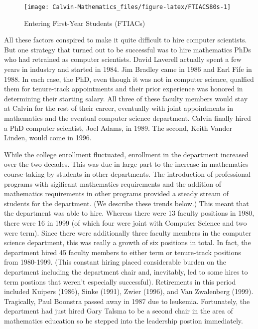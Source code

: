 \documentclass[
]{book}
\begin{document}
\begin{figure}

{\centering \texttt{[image: Calvin-Mathematics\_files/figure-latex/FTIACS80s-1]} 

}

\caption{Entering First-Year Students (FTIACs)}\label{fig:FTIACS80s}
\end{figure}

All these factors conspired to make it quite difficult to hire computer scientists. But one strategy that turned out to be successful was to hire mathematics PhDs who had retrained as computer scientists. David Laverell actually spent a few years in industry and started in 1984. Jim Bradley came in 1986 and Earl Fife in 1988. In each case, the PhD, even though it was not in computer science, qualfied them for tenure-track appointments and their prior experience was honored in determining their starting salary. All three of these faculty members would stay at Calvin for the rest of their career, eventually with joint appointments in mathematics and the eventual computer science department.
Calvin finally hired a PhD computer scientist, Joel Adams, in 1989. The second, Keith Vander Linden, would come in 1996.

While the college enrollment fluctuated, enrollment in the department increased over the two decades. This was due in large part to the increase in mathematics course-taking by students in other departments. The introduction of professional programs with sigificant mathematics requirements and the addition of mathematics requirements in other programs provided a steady stream of students for the department. (We describe these trends below.) This meant that the department was able to hire. Whereas there were 13 faculty positions in 1980, there were 16 in 1999 (of which four were joint with Computer Science and two were term). Since there were additionally three faculty members in the computer science department, this was really a growth of six positions in total. In fact, the department hired 45 faculty members to either term or tenure-track positions from 1980-1999. (This constant hiring placed considerable burden on the department including the department chair and, inevitably, led to some hires to term postions that weren't especially successful). Retirements in this period included Kuipers (1986), Sinke (1991), Zwier (1996), and Van Zwalenberg (1999). Tragically, Paul Boonstra passed away in 1987 due to leukemia. Fortunately, the department had just hired Gary Talsma to be a second chair in the area of mathematics education so he stepped into the leadership postion immediately.
\end{document}

